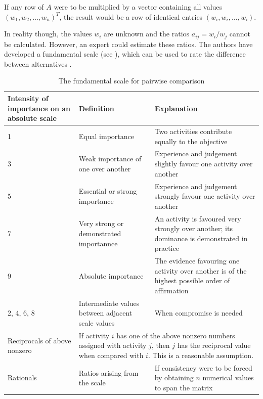 If any row of $A$ were to be multiplied by a vector containing all values $(w_1, w_2, \ldots, w_n)^T$, the result would be a row of identical entries $(w_i, w_i, \ldots, w_i)$. 

In reality though, the values $w_i$ are unknown and the ratios $a_{ij} = w_i/w_j$ cannot be calculated. However, an expert could estimate these ratios. The authors have developed a fundamental scale (see ), which can be used to rate the difference between alternatives \cite{Saaty:1990}.

\begin{table}
    \begin{center}
        \begin{tabular}{p{2.5cm}p{4cm}p{6cm}}
            \hline
            Intensity of importance on an absolute scale & Definition & Explanation \\
            \hline
            1 & Equal importance & Two activities contribute equally to the objective \\
            3 & Weak importance of one over another & Experience and judgement slightly favour one activity over another \\
            5 & Essential or strong importance & Experience and judgement strongly favour one activity over another \\
            7 & Very strong or demonstrated importannce & An activity is favoured very strongly over another; its dominance is  demonstrated in practice \\
            9 & Absolute importance & The evidence favouring one activity over another is of the highest possible order of affirmation \\
            2, 4, 6, 8 & Intermediate values between adjacent scale values & When compromise is needed \\
            Reciprocals of above nonzero & \multicolumn{2}{p{10cm}}{If activity $i$ has one of the above nonzero numbers assigned with activity $j$, then $j$ has the reciprocal value when compared with $i$. This is a reasonable assumption.} \\
            Rationals & Ratios arising from the scale & If consistency were to be forced by obtaining $n$ numerical values to span the matrix \\
            \hline
        \end{tabular}
        \caption{The fundamental scale for pairwise comparison\cite{Saaty:1990}}
        \label{tab:ahp-scale}
    \end{center}
\end{table}

